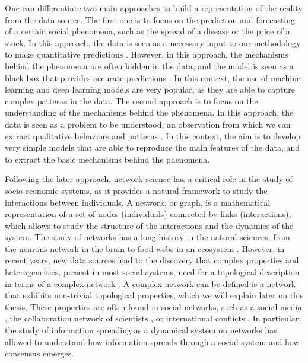 One can differentiate two main approaches to build a representation of the reality from the data source. The first one is to focus on the prediction and forecasting of a certain social phenomena, such as the spread of a disease or the price of a stock. In this approach, the data is seen as a necessary input to our methodology to make quantitative predictions \cite{lazer-2009}. However, in this approach, the mechanisms behind the phenomena are often hidden in the data, and the model is seen as a black box that provides accurate predictions \cite{rudin-2019}. In this context, the use of machine learning \cite{murphy-2012} and deep learning \cite{goodfellow-2016} models are  very popular, as they are able to capture complex patterns in the data. The second approach is to focus on the understanding of the mechanisms behind the phenomena. In this approach, the data is seen as a problem to be understood, an observation from which we can extract qualitative behaviors and patterns \cite{axelrod-1997}. In this context, the aim is to develop very simple models that are able to reproduce the main features of the data, and to extract the basic mechanisms behind the phenomena.

Following the later approach, network science has a critical role in the study of socio-economic systems, as it provides a natural framework to study the interactions between individuals. A network, or graph, is a mathematical representation of a set of nodes (individuals) connected by links (interactions), which allows to study the structure of the interactions and the dynamics of the system. The study of networks has a long history in the natural sciences, from the neurons network in the brain \cite{sporns-2004} to food webs in an ecosystem \cite{ings-2008, elith-2009, bastolla-2009}. However, in recent years, new data sources lead to the discovery that complex properties and heterogeneities, present in most social systems, need for a topological description in terms of a complex network \cite{newman-book, dorogovtsev2002evolution, kilduff2003social}. A complex network can be defined is a network that exhibits non-trivial topological properties, which we will explain later on this thesis. These properties are often found in social networks, such as a social media \cite{dunbar-2015}, the collaboration network of scientists \cite{newman-coll-2001,radicchi-2008}, or international conflicts \cite{hafnerburton-2009, diaz2023network}. In particular, the study of information spreading as a dynamical system on networks has allowed to understand how information spreads through a social system and how consensus emerges.

